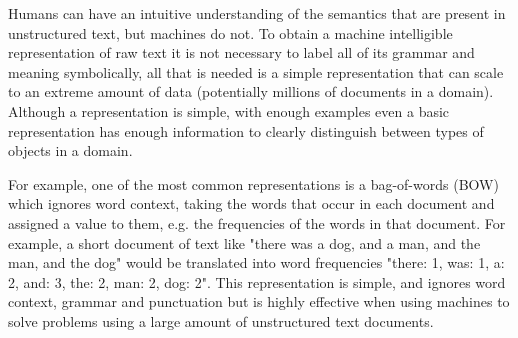 

Humans can have an intuitive understanding of the semantics that are present in unstructured text, but machines do not.  To obtain a machine intelligible representation of raw text it is not necessary to  label all of its grammar and meaning symbolically, all that is needed is a simple representation that can scale to an extreme amount of data (potentially millions of documents in a domain). Although a representation is simple, with enough examples even a basic representation has enough information to clearly distinguish between types of objects in a domain.

For example, one of the most common representations is a bag-of-words (BOW) which ignores word context, taking the words that occur in each document and assigned a value to them, e.g. the frequencies of the words in that document. For example, a short document of text like "there was a dog, and a man, and the man, and the dog" would be translated into word frequencies "there: 1, was: 1, a: 2, and: 3, the: 2, man: 2, dog: 2". This representation is simple, and ignores word context, grammar and punctuation but is highly effective when using machines to solve problems using a large amount of unstructured text documents.


